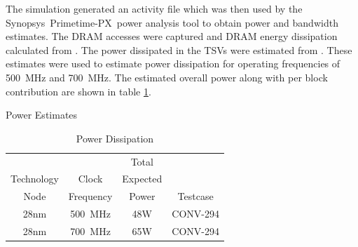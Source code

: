 \documentclass[journal]{IEEEtran}
\begin{document}
The simulation generated an activity file which was then used by the Synopsys\textregistered ~Primetime-PX\texttrademark ~power analysis tool to obtain power and bandwidth estimates.
The DRAM accesses were captured and DRAM energy dissipation calculated from \cite{tezzaron:diram4}. The power dissipated in the TSVs were estimated from \cite{liu2012compact}.
These estimates were used to estimate power dissipation for operating frequencies of \SI{500}{\mega\hertz} and \SI{700}{\mega\hertz}.
The estimated overall power along with per block contribution are shown in table \ref{tab:Simulation-based estimates}.

\begin{table}[h]
  \captionsetup{justification=centering, skip=3pt}
  \caption{Power Estimates}
  \vspace{3pt}
  \label{tab:Simulation-based estimates}
  \centering
  \begin{subtable}{0.5\textwidth}
    \centering
    \begin{adjustbox}{width=0.85\textwidth}
      \begin{tabular}{cccc}
        \toprule
                         &                       & Total    &                                          \\  %
            Technology   & Clock                 & Expected &                                          \\  %
                Node     & Frequency             &  Power   &  Testcase                                \\  %
        \hline  %
                   28nm  & \SI{500}{\mega\hertz} &   48W    &  CONV-294\\ %
                   28nm  & \SI{700}{\mega\hertz} &   65W    &  CONV-294\\ %
        \bottomrule
      \end{tabular}
    \end{adjustbox}
    \vspace{3pt}
    \captionsetup{justification=centering, skip=10pt}
    \caption{Power Dissipation}

\end{subtable}
\end{table}
\end{document}
